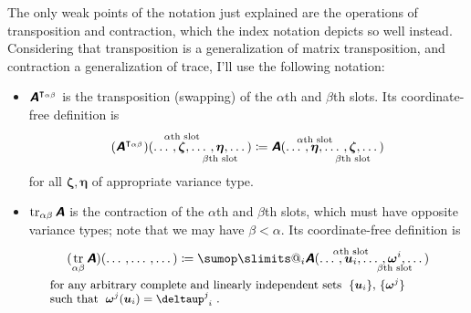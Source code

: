 \documentclass[\ifafour a4paper,12pt,\else a5paper,10pt,\fi%
onecolumn,oneside,article,%
british%
]{memoir}
\makeatletter
\theoremstyle{remark}
\theoremstyle{innote}
\def\sum{\DOTSI\sumop\slimits@}
\newcommand*{\mathte}[1]{\textbf{\textit{\textsf{#1}}}}
\newcommand*{\delt}{\deltaup}%
\DeclareMathOperator{\tr}{tr}%
\newcommand*{\defd}{\coloneqq}
\DeclarePairedDelimiter\set{\{}{\}}
\renewcommand*{\|}[1][]{\nonscript\,#1\vert\nonscript\;\mathopen{}}
\newcommand*{\tsum}{\mathop{\textstyle\sum}\nolimits}
\newcommand*{\yA}{\mathte{A}}
\renewcommand*{\i}{\indices}
\newcommand*{\id}{\mathbf{id}}%
\makeatother
\begin{document}
The only weak points of the notation just explained are the operations of
transposition and contraction, which the index notation depicts so well
instead. Considering that transposition is a generalization of matrix
transposition, and contraction a generalization of trace, I'll use the
following notation:
\begin{itemize}[wide]%
\item $\yA^{\intercal_{\alpha\beta}}$ is the transposition
  (swapping) of the $\alpha$th and $\beta$th slots. Its coordinate-free
  definition is
  \begin{equation}
    \label{eq:def_transp}
    (\yA^{\intercal_{\alpha\beta}})(\dotso,
    \overset{\mathclap{\scriptstyle\text{$\alpha$th slot}}}{\bm{\zeta}}
    ,\dotso,
    \underset{\mathclap{\scriptstyle\text{$\beta$th slot}}}{\bm{\eta}}
    ,\dotso)
    \defd
    \yA(\dotso,
    \overset{\mathclap{\scriptstyle\text{$\alpha$th slot}}}{\bm{\eta}}
    ,\dotso,
    \underset{\mathclap{\scriptstyle\text{$\beta$th slot}}}{\bm{\zeta}}
    ,\dotso)
  \end{equation}
  for all $\bm{\zeta},\bm{\eta}$ of appropriate variance type.
  
\item $\tr_{\alpha\beta}\yA$ is the contraction of the $\alpha$th and
  $\beta$th slots, which must have opposite variance types; note that we may
  have $\beta < \alpha$. Its coordinate-free definition is
  \begin{equation}
    \label{eq:def_contr}
    \begin{gathered}
      (\tr_{\alpha\beta}\yA)(\dotso
        ,\dotso
        ,\dotso)
        \defd
        \sum_{i} \yA(\dotso,
        \overset{\mathclap{\scriptstyle\text{$\alpha$th slot}}}{\bm{u}_{i}}
        ,\dotso,
        \underset{\mathclap{\scriptstyle\text{$\beta$th slot}}}{\bm{\omega}^{i}}
        ,\dotso)
      \\
      \parbox{0.9\columnwidth}{\small for any arbitrary complete and
        linearly independent sets \;$\set{\bm{u}_{i}}$,
        $\set{\bm{\omega}^{j}}$\\
        such that \;$\bm{\omega}^{j}(\bm{u}_{i}) = \delt\i{^{j}_{i}}$~.}
    \end{gathered}
  \end{equation}
\end{itemize}
\end{document}

